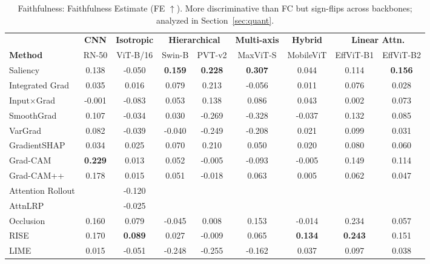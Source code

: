 \documentclass[final,5p,times,twocolumn]{elsarticle}
\newcommand{\best}[1]{\textbf{#1}}
\newcommand{\nd}{\textemdash}
\begin{document}
\begin{table}[t]
  \centering
  \caption{Faithfulness: Faithfulness Estimate (FE $\uparrow$). More discriminative than FC but sign-flips across backbones; analyzed in Section~\ref{sec:quant}.}
  \label{tab:fe}
  \setlength{\tabcolsep}{4pt}
  \begin{tabular}{l cc cc cc cc}
    \toprule
     & \multicolumn{1}{c}{\textbf{CNN}} & \multicolumn{1}{c}{\textbf{Isotropic}} & \multicolumn{2}{c}{\textbf{Hierarchical}} & \multicolumn{1}{c}{\textbf{Multi-axis}} & \multicolumn{1}{c}{\textbf{Hybrid}} & \multicolumn{2}{c}{\textbf{Linear Attn.}} \\
    \cmidrule(lr){2-2} \cmidrule(lr){3-3} \cmidrule(lr){4-5} \cmidrule(lr){6-6} \cmidrule(lr){7-7} \cmidrule(lr){8-9}
    \textbf{Method} & RN-50 & ViT-B/16 & Swin-B & PVT-v2 & MaxViT-S & MobileViT & EffViT-B1 & EffViT-B2 \\
    \midrule
    Saliency & 0.138 & -0.050 & \best{0.159} & \best{0.228} & \best{0.307} & 0.044 & 0.114 & \best{0.156} \\
    Integrated Grad & 0.035 & 0.016 & 0.079 & 0.213 & -0.056 & 0.011 & 0.076 & 0.028 \\
    Input$\times$Grad & -0.001 & -0.083 & 0.053 & 0.138 & 0.086 & 0.043 & 0.002 & 0.073 \\
    SmoothGrad & 0.107 & -0.034 & 0.030 & -0.269 & -0.328 & -0.037 & 0.132 & 0.085 \\
    VarGrad & 0.082 & -0.039 & -0.040 & -0.249 & -0.208 & 0.021 & 0.099 & 0.031 \\
   GradientSHAP & 0.034 & 0.025 & 0.070 & 0.210 & 0.050 & 0.020 & 0.080 & 0.060 \\
    \midrule
    Grad-CAM & \best{0.229} & 0.013 & 0.052 & -0.005 & -0.093 & -0.005 & 0.149 & 0.114 \\
    Grad-CAM++ & 0.178 & 0.015 & 0.051 & -0.018 & 0.063 & 0.005 & 0.062 & 0.047 \\
    \midrule
    Attention Rollout & \nd & -0.120 & \nd & \nd & \nd & \nd & \nd & \nd \\
    AttnLRP &\nd & -0.025 & \nd & \nd & \nd & \nd & \nd & \nd \\
    \midrule
    Occlusion & 0.160 & 0.079 & -0.045 & 0.008 & 0.153 & -0.014 & 0.234 & 0.057 \\
    RISE & 0.170 & \best{0.089} & 0.027 & -0.009 & 0.065 & \best{0.134} & \best{0.243} & 0.151 \\
    LIME & 0.015 & -0.051 & -0.248 & -0.255 & -0.162 & 0.037 & 0.097 & 0.038 \\
    \bottomrule
  \end{tabular}
\end{table}
\end{document}
